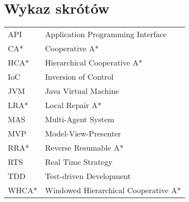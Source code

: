 \chapter*{Wykaz skrótów}

\begin{tabular}{l l}
API & Application Programming Interface \\
CA* & Cooperative A* \\
HCA* & Hierarchical Cooperative A* \\
IoC & Inversion of Control \\
JVM & Java Virtual Machine \\
LRA* & Local Repair A* \\
MAS & Multi-Agent System \\
MVP & Model-View-Presenter \\
RRA* & Reverse Resumable A* \\
RTS & Real Time Strategy \\
TDD & Test-driven Development \\
WHCA* & Windowed Hierarchical Cooperative A* \\

\end{tabular}
